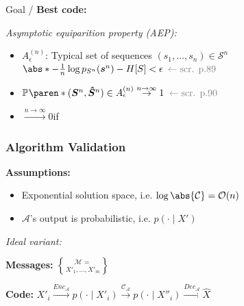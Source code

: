 Goal / \textbf{Best code:}\enspace
{}

\emph{Asymptotic equiparition property (AEP):}
\vspace{-2pt}
\begin{itemize}
    \item $A_\epsilon^{(n)}$:
        Typical set of sequences $(s_1,\ldots,s_n) \in \mathcal S^n$\\\qquad
        $\abs*{-\frac1n \log p_{S^n} (\bm s^n) - H[S]} < \epsilon$\hfill
        $\color{gray} \leftarrow \text{scr. p.89}$
    \item $\P*{(\bm S^n, \bm{\hat S}^n) \in A_\epsilon^{(n)}} \overset{n\to\infty}{\to} 1$\hfill
        $\color{gray} \leftarrow \text{scr. p.90}$
    \item {}
        $\overset{n\to\infty}{\to} 0$\enspace if\enspace {}
\end{itemize}


\subsubsection{Algorithm Validation}

\textbf{Assumptions:}
\begin{itemize}
    \item Exponential solution space, i.e. $\log\abs{\mathcal C} = \mathcal O(n)$
    \item $\mathcal A$'s output is probabilistic, i.e. $p(\cdot \mid X')$
\end{itemize}

\emph{Ideal variant:}

\textbf{Messages:}\enspace
$\mathcal M = \brace{ X'_1, \ldots, X'_m }$
\vspace{-2pt}

\textbf{Code:}\enspace
$X'_i \xrightarrow{Enc_{\mathcal A}} p(\cdot\mid X'_i)
\xrightarrow{\mathcal{C_A}} p(\cdot\mid X''_i)
\xrightarrow{Dec_{\mathcal A}} \hat X$
\iffalse
    \begin{itemize}
        \item $Enc_{\mathcal A}$:\enspace
            encodes $X'_i \in \mathcal M$ as $p(\cdot\mid X'_i)$.
        \item $Dec_{\mathcal A}$:\enspace
            selects $\hat X = \arg\max\limits_X \kappa(X''_i, X)$\\
            whereby $\kappa(X'', X') \coloneqq \sum_c p(c\mid X'') p(c\mid X')$
    \end{itemize}
\fi

